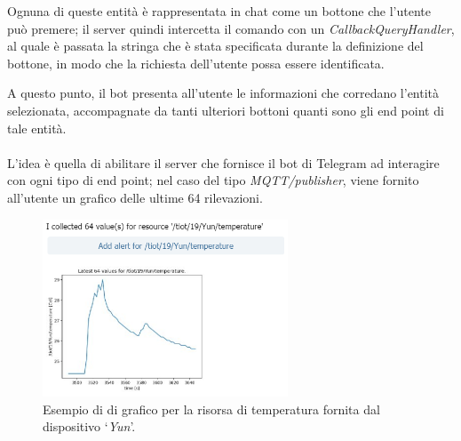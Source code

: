 \documentclass[12pt,a4paper]{article}
\begin{document}
\noindent Ognuna di queste entità è rappresentata in chat come un bottone che l'utente può premere; il server quindi intercetta il comando con un \textit{CallbackQueryHandler}, al quale è passata la stringa che è stata specificata durante la definizione del bottone, in modo che la richiesta dell'utente possa essere identificata.

A questo punto, il bot presenta all'utente le informazioni che corredano l'entità selezionata, accompagnate da tanti ulteriori bottoni quanti sono gli end point di tale entità.
\\ \\
L'idea è quella di abilitare il server che fornisce il bot di Telegram ad interagire con ogni tipo di end point; nel caso del tipo \textit{MQTT/publisher}, viene fornito all'utente un grafico delle ultime 64 rilevazioni.

\begin{figure}[htbp]
    \centering
    \includegraphics[width=0.65\textwidth]{bot_temp_graph.png}
    \caption*{Esempio di di grafico per la risorsa di temperatura fornita dal dispositivo `\textit{Yun}'.}
    \label{fig:bot_temp_graph}
\end{figure}
\end{document}

